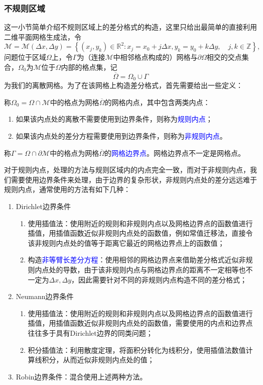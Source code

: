 \documentclass[a4paper,10pt]{ctexart}
\begin{document}
\subsubsection{不规则区域}
这一小节简单介绍不规则区域上的差分格式的构造，这里只给出最简单的直接利用二维平面网格生成法，令
\[
    \mathcal{M} = \mathcal{M}(\Delta x,\Delta y) = \left\{ (x_j,y_k) \in \mathbb{R}^2: x_j = x_0+j\Delta x,y_k = y_0+k\Delta y,\quad j,k\in \mathbb{Z} \right\},
\]
问题位于区域$ \Omega $上，令$ \Gamma $为（连接$ \mathcal{M} $中相邻格点构成的）网格与$ \partial \Omega $相交的交点集合，$ \Omega_0 $为$ \mathcal{M} $位于$ \Omega $内部的格点集，记
\[
    \overline{\Omega} = \Omega_0 \cup \Gamma
\]
为我们的离散网格。为了在该网格上构造差分格式，首先需要给出一些定义：
\begin{definition}
    称$ \Omega_0 = \Omega \cap \mathcal{M} $中的格点为网格$ \overline{\Omega} $的网格内点，其中包含两类内点：
    \begin{enumerate}
        \item 如果该内点处的离散不需要使用到边界条件，则称为\textcolor{blue}{规则内点}；
        \item 如果该内点处的差分方程需要使用到边界条件，则称为\textcolor{blue}{非规则内点}。
    \end{enumerate}
    称$ \Gamma = \Omega \cap \partial \mathcal{M} $中的格点为网格$ \overline{\Omega} $的\textcolor{blue}{网格边界点}。网格边界点不一定是网格点。
\end{definition}
对于规则内点，处理的方法与规则区域内的内点完全一致，而对于非规则内点，我们需要使用边界条件来处理，由于边界的复杂形状，非规则内点处的差分远远难于规则内点，通常使用的方法有如下几种：
\begin{enumerate}
    \item Dirichlet边界条件
    \begin{enumerate}
        \item 使用插值法：使用附近的规则和非规则内点以及网格边界点的函数值进行插值，用插值函数近似非规则内点处的函数值，例如常值迁移法，直接令该非规则内点处的值等于距离它最近的网格边界点上的函数值；
        \item 构造\textcolor{blue}{非等臂长差分方程}：使用相邻的网格边界点来借助差分格式近似非规则内点处的导数，由于该非规则内点与网格边界点的距离不一定相等也不一定为$ \Delta x,\Delta y $，因此需要针对不同的非规则内点构造不同的差分格式；
    \end{enumerate}
    \item Neumann边界条件
    \begin{enumerate}
        \item 使用插值法：使用附近的规则和非规则内点以及网格边界点的函数值进行插值，用插值函数近似非规则内点处的函数值，需要使用的内点和边界点往往多于具有Dirichlet边界的同类问题；
        \item 积分插值法：利用散度定理，将面积分转化为线积分，使用插值法数值计算线积分，从而近似非规则内点处的值；
    \end{enumerate}
    \item Robin边界条件：混合使用上述两种方法。
\end{enumerate}
\end{document}
